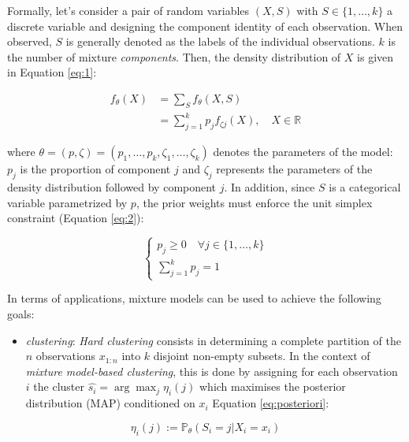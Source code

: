 Formally, let's consider a pair of random variables \((X,S)\) with \(S \in \{1, \ldots, k\}\) a discrete variable and designing
the component identity of each observation. When observed, \(S\) is
generally denoted as the labels of the individual observations. \(k\) is
the number of mixture \emph{components}. Then, the density distribution of
\(X\) is given in Equation \eqref{eq:1}:

\begin{equation}
\begin{split}
f_\theta(X) &= \sum_S f_\theta (X, S) \\
&= \sum_{j=1}^k p_j f_{\zeta j}(X), \quad X\in\mathbb{R}
\end{split}
\label{eq:1}
\end{equation}

where \(\theta = (p, \zeta) = (p_1, \ldots, p_k, \zeta_1, \ldots, \zeta_k)\)
denotes the parameters of the model: \(p_j\) is the proportion of
component \(j\) and \(\zeta_j\) represents the parameters of the density
distribution followed by component \(j\). In addition, since \(S\) is a categorical variable parametrized by \(p\), the prior weights must enforce the unit simplex constraint (Equation \eqref{eq:2}):

\begin{equation}
\begin{cases}
p_j \ge 0 \quad \forall j \in \{1, \ldots, k \}\\
\sum_{j=1}^k p_j =1
\end{cases}
\label{eq:2}
\end{equation}

In terms of applications, mixture models can be used to achieve the
following goals:

\begin{itemize}
\tightlist
\item
  \emph{clustering}: \emph{Hard clustering} consists in determining a complete
  partition of the \(n\) observations \(x_{1:n}\) into \(k\) disjoint
  non-empty subsets. In the context of \emph{mixture model-based
  clustering}, this is done by assigning for each observation \(i\) the
  cluster \(\hat{s_i}=\arg \max_j \eta_{i} (j)\) which maximises the
  posterior distribution (MAP) conditioned on \(x_i\) Equation
  \eqref{eq:posteriori}:
\end{itemize}

\begin{equation}
        \eta_{i} (j) := \mathbb{P}_{\theta} (S_i=j |X_i=x_i)
    \label{eq:posteriori}
\end{equation}


